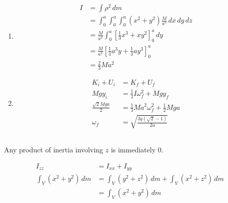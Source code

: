 \documentclass{article}
\begin{document}
\begin{enumerate}
  \item

        \begin{align*}
          I & = \int \rho^2 \,d m                                                       \\
            & = \int_0^a \int_0^a \int_0^a (x^2 + y^2) \frac{M}{a^3} \,d x \,d y \,d z  \\
            & = \frac{M}{a^2} \int_0^a \left[ \frac{1}{3} x^3 + x y^2 \right]_0^a \,d y \\
            & = \frac{M}{a^2} \left[ \frac{1}{3} a^3 y + \frac{1}{3} a y^3 \right]_0^a  \\
            & = \frac{2}{3} M a^2
        \end{align*}

  \item

        \begin{align*}
          K_i + U_i                & = K_f + U_f                                        \\
          M g y_i                  & = \frac{1}{2} I \omega_f^2 + M g y_f               \\
          \frac{\sqrt{2} M g a}{2} & = \frac{1}{3} M a^2 \omega_f^2 + \frac{1}{2} M g a \\
          \omega_f                 & = \sqrt{\frac{3 g (\sqrt{2} - 1)}{2 a}}
        \end{align*}
\end{enumerate}

\setcounter{subsection}{22}
\subsection{}

Any product of inertia involving $z$ is immediately $0$.

\begin{align*}
  I_{z z}                  & = I_{x x} + I_{y y}                                   \\
  \int_V (x^2 + y^2) \,d m & = \int_V (y^2 + z^2) \,d m + \int_V (x^2 + z^2) \,d m \\
                           & = \int_V (x^2 + y^2) \,d m
\end{align*}

\setcounter{subsection}{24}
\subsection{}
\end{document}
